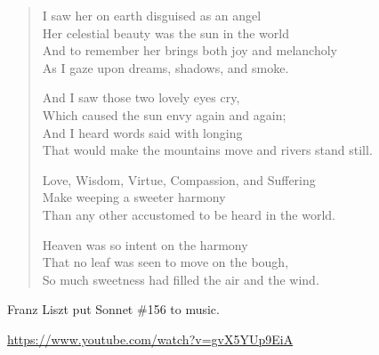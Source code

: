 \begin{verse}
I saw her on earth disguised as an angel\\
Her celestial beauty was the sun in the world\\
And to remember her brings both joy and melancholy\\
As I gaze upon dreams, shadows, and smoke.

And I saw those two lovely eyes cry,\\
Which caused the sun envy again and again;\\
And I heard words said with longing\\
That would make the mountains move and rivers stand still.

Love, Wisdom, Virtue, Compassion, and Suffering\\
Make weeping a sweeter harmony\\
Than any other accustomed to be heard in the world.

Heaven was so intent on the harmony\\
That no leaf was seen to move on the bough,\\
So much sweetness had filled the air and the wind.
\end{verse}

Franz Liszt put Sonnet \#156 to music.

\url{https://www.youtube.com/watch?v=gvX5YUp9EiA}


